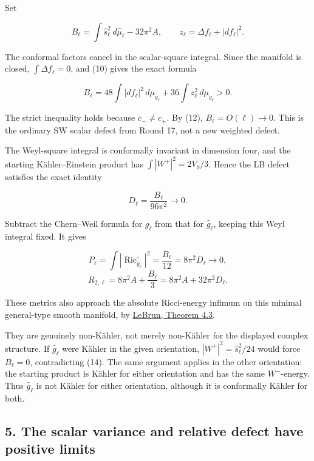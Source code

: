 \documentclass[
  11pt,
]{article}
\begin{document}
Set

\[
 B_\ell=\int\widehat s_\ell^2\,d\widehat\mu_\ell-32\pi^2A,
 \qquad z_\ell=\Delta f_\ell+|df_\ell|^2.
\]

The conformal factors cancel in the scalar-square integral. Since the
manifold is closed, \(\int\Delta f_\ell=0\), and (10) gives the exact
formula

\[
 \boxed{B_\ell=48\int|df_\ell|^2\,d\mu_{g_\ell}
                   +36\int z_\ell^2\,d\mu_{g_\ell}>0.}
 \tag{14}
\]

The strict inequality holds because \(c_-\ne c_+\). By (12),
\(B_\ell=O(\ell)\to0\). This is the ordinary SW scalar defect from Round
17, not a new weighted defect.

The Weyl-square integral is conformally invariant in dimension four, and
the starting Kähler--Einstein product has \(\int|W^+|^2=2V_0/3\). Hence
the LB defect satisfies the exact identity

\[
 \boxed{D_\ell=\frac{B_\ell}{96\pi^2}\longrightarrow0.}
 \tag{15}
\]

Subtract the Chern--Weil formula for \(g_\ell\) from that for
\(\widehat g_\ell\), keeping this Weyl integral fixed. It gives

\[
 \boxed{P_\ell=\int|\operatorname{Ric}^{\circ}_{\widehat g_\ell}|^2
       =\frac{B_\ell}{12}=8\pi^2D_\ell\longrightarrow0,}
 \tag{16}
\] \[
 \boxed{R_{2,\ell}=8\pi^2 A+\frac{B_\ell}{3}
                    =8\pi^2 A+32\pi^2D_\ell.}
 \tag{17}
\]

These metrics also approach the absolute Ricci-energy infimum on this
minimal general-type smooth manifold, by
\href{https://arxiv.org/pdf/math/0003068}{LeBrun, Theorem 4.3}.

They are genuinely non-Kähler, not merely non-Kähler for the displayed
complex structure. If \(\widehat g_\ell\) were Kähler in the given
orientation, \(|W^+|^2=\widehat s_\ell^2/24\) would force \(B_\ell=0\),
contradicting (14). The same argument applies in the other orientation:
the starting product is Kähler for either orientation and has the same
\(W^-\)-energy. Thus \(\widehat g_\ell\) is not Kähler for either
orientation, although it is conformally Kähler for both.

\hypertarget{the-scalar-variance-and-relative-defect-have-positive-limits}{%
\subsection{5. The scalar variance and relative defect have positive
limits}\label{the-scalar-variance-and-relative-defect-have-positive-limits}}
\end{document}
